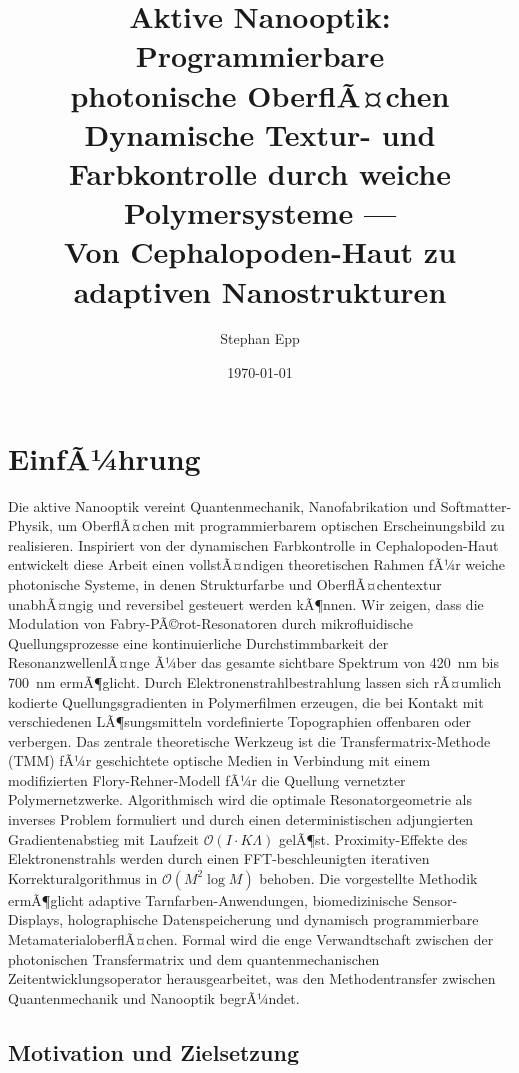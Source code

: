 ﻿\documentclass[a4paper,12pt]{article}
\title{\textbf{Aktive Nanooptik: Programmierbare\\ photonische OberflÃ¤chen} \\ [0.8ex]
	\large Dynamische Textur- und Farbkontrolle durch weiche Polymersysteme ---\\
	Von Cephalopoden-Haut zu adaptiven Nanostrukturen}
\author{Stephan Epp}
\date{\today}
\theoremstyle{definition}
\newcommand{\ordre}[1]{\mathcal{O}\!\left(#1\right)}
\begin{document}
	
	\maketitle
	
	\tableofcontents
	\newpage
	
	\section{EinfÃ¼hrung}
	\label{sec:einfuehrung}
	Die aktive Nanooptik vereint Quantenmechanik, Nanofabrikation und Soft\-matter-Physik,
	um OberflÃ¤chen mit programmierbarem optischen Erscheinungsbild zu realisieren.
	Inspiriert von der dynamischen Farbkontrolle in Cephalopoden-Haut entwickelt diese
	Arbeit einen vollstÃ¤ndigen theoretischen Rahmen fÃ¼r weiche photonische Systeme,
	in denen Strukturfarbe und OberflÃ¤chentextur unabhÃ¤ngig und reversibel gesteuert
	werden kÃ¶nnen.
	Wir zeigen, dass die Modulation von Fabry-PÃ©rot-Resonatoren durch mikrofluidische
	Quellungsprozesse eine kontinuierliche Durchstimmbarkeit der ResonanzwellenlÃ¤nge
	Ã¼ber das gesamte sichtbare Spektrum von \SI{420}{nm} bis \SI{700}{nm} ermÃ¶glicht.
	Durch Elektronenstrahlbestrahlung lassen sich rÃ¤umlich kodierte Quellungsgradienten
	in Polymerfilmen erzeugen, die bei Kontakt mit verschiedenen LÃ¶sungsmitteln
	vordefinierte Topographien offenbaren oder verbergen.
	Das zentrale theoretische Werkzeug ist die Transfermatrix-Methode (TMM) fÃ¼r
	geschichtete optische Medien in Verbindung mit einem modifizierten Flory-Rehner-Modell
	fÃ¼r die Quellung vernetzter Polymernetzwerke.
	Algorithmisch wird die optimale Resonatorgeometrie als inverses Problem formuliert
	und durch einen deterministischen adjungierten Gradientenabstieg mit
	Laufzeit $\ordre{I \cdot K\Lambda}$ gelÃ¶st.
	Proximity-Effekte des Elektronenstrahls werden durch einen FFT-beschleunigten
	iterativen Korrekturalgorithmus in $\ordre{M^2 \log M}$ behoben.
	Die vorgestellte Methodik ermÃ¶glicht adaptive Tarnfarben-Anwendungen,
	biomedizinische Sensor-Displays, holographische Datenspeicherung und dynamisch
	programmierbare MetamaterialoberflÃ¤chen.
	Formal wird die enge Verwandtschaft zwischen der photonischen Transfermatrix und
	dem quantenmechanischen Zeitentwicklungsoperator herausgearbeitet, was den
	Methodentransfer zwischen Quantenmechanik und Nanooptik begrÃ¼ndet.
	
	\subsection{Motivation und Zielsetzung}
	
\end{document}
